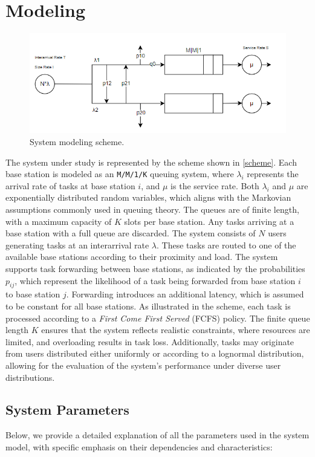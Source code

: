 \documentclass{report}
\begin{document}
\chapter{Modeling}

\begin{figure}[H]
    \centering
    \includegraphics[width=\textwidth]{img/immagine.png}
    \caption{System modeling scheme.}
    \label{scheme}
\end{figure}

The system under study is represented by the scheme shown in \autoref{scheme}. Each base station is modeled as an \texttt{M/M/1/K} queuing system, where $\lambda_i$ represents the arrival rate of tasks at base station $i$, and $\mu$ is the service rate.
Both $\lambda_i$ and $\mu$ are exponentially distributed random variables, which aligns with the Markovian assumptions commonly used in queuing theory. The queues are of finite length, with a maximum capacity of $K$ slots per base station. Any tasks arriving at a base station with a full queue are discarded.
The system consists of $N$ users generating tasks at an interarrival rate $\lambda$. These tasks are routed to one of the available base stations according to their proximity and load. The system supports task forwarding between base stations, as indicated by the probabilities $p_{ij}$, which represent the likelihood of a task being forwarded from base station $i$ to base station $j$. Forwarding introduces an additional latency, which is assumed to be constant for all base stations.
As illustrated in the scheme, each task is processed according to a \textit{First Come First Served} (FCFS) policy. The finite queue length $K$ ensures that the system reflects realistic constraints, where resources are limited, and overloading results in task loss. Additionally, tasks may originate from users distributed either uniformly or according to a lognormal distribution, allowing for the evaluation of the system's performance under diverse user distributions.

\section{System Parameters}
Below, we provide a detailed explanation of all the parameters used in the system model, with specific emphasis on their dependencies and characteristics:
\end{document}
